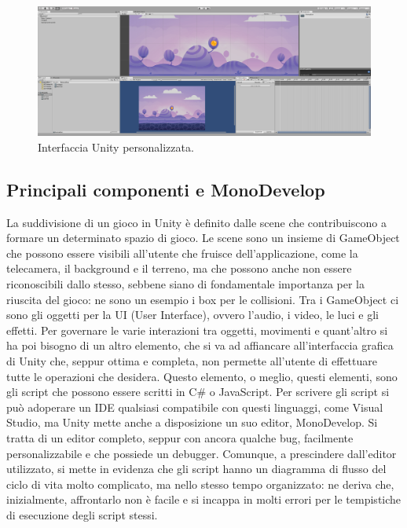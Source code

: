 	\begin{figure}[h]
	\centering
	\includegraphics [width=\textwidth]{img/Unity_organizzazione.png}
	\caption{\label{fig:interface} Interfaccia Unity personalizzata.}
	\end{figure}

\subsection{Principali componenti e MonoDevelop}

La suddivisione di un gioco in Unity è definito dalle scene che contribuiscono a formare un determinato spazio di gioco. Le scene sono un insieme di GameObject che possono essere visibili all’utente che fruisce dell’applicazione, come la telecamera, il background e il terreno, ma che possono anche non essere riconoscibili dallo stesso, sebbene siano di fondamentale importanza per la riuscita del gioco: ne sono un esempio i box per le collisioni.
Tra i GameObject ci sono gli oggetti per la UI (User Interface), ovvero l’audio, i video, le luci e gli effetti. Per governare le varie interazioni tra oggetti, movimenti e quant’altro si ha poi bisogno di un altro elemento, che si va ad affiancare all’interfaccia grafica di Unity che, seppur ottima e completa, non permette all’utente di effettuare tutte le operazioni che desidera. Questo elemento, o meglio, questi elementi, sono gli script che possono essere scritti in C\#  o JavaScript. Per scrivere gli script si può adoperare un IDE qualsiasi compatibile con questi linguaggi, come Visual Studio, ma Unity mette anche a disposizione un suo editor, MonoDevelop. Si tratta di un editor completo, seppur con ancora qualche bug, facilmente personalizzabile e che possiede un debugger.
Comunque, a prescindere dall’editor utilizzato, si mette in evidenza che gli script hanno un diagramma di flusso del ciclo di vita molto complicato, ma nello stesso tempo organizzato: ne deriva che, inizialmente, affrontarlo non è facile e si incappa in molti errori per le tempistiche di esecuzione degli script stessi.


